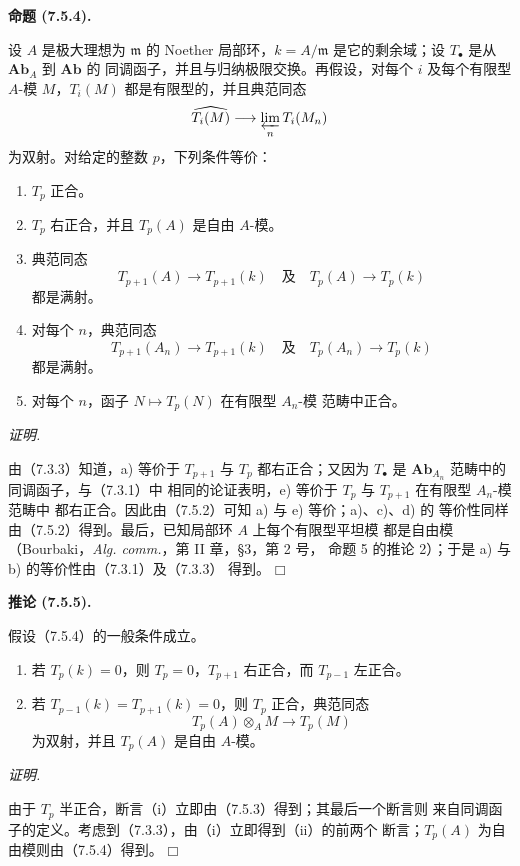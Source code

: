 \documentclass[UTF8,fontset=none,11pt,oneside,openany]{ctexbook}
\providecommand{\square}{\mdlgwhtsquare}
\newenvironment{proposition}[1][]{%
  \par\medskip\noindent\textbf{命题 (#1).}\ %
}{\par}
\newenvironment{corollary}[1][]{%
  \par\medskip\noindent\textbf{推论 (#1).}\ %
}{\par}
\newenvironment{proof}{%
  \par\smallskip\noindent\textit{证明.}\ %
}{\hfill$\square$\par}
\begin{document}
\begin{proposition}[7.5.4]
设 $A$ 是极大理想为 $\mathfrak m$ 的 Noether 局部环，$k=A/\mathfrak m$
是它的剩余域；设 $T_\bullet$ 是从 $\mathbf{Ab}_A$ 到 $\mathbf{Ab}$ 的
同调函子，并且与归纳极限交换。再假设，对每个 $i$ 及每个有限型
$A$-模 $M$，$T_i(M)$ 都是有限型的，并且典范同态
\[
  \widehat{T_i(M)}
  \longrightarrow
  \varprojlim_n T_i(M_n)
\]
为双射。对给定的整数 $p$，下列条件等价：
\begin{enumerate}
  \item[a)] $T_p$ 正合。
  \item[b)] $T_p$ 右正合，并且 $T_p(A)$ 是自由 $A$-模。
  \item[c)] 典范同态
    \[
      T_{p+1}(A)\longrightarrow T_{p+1}(k)
      \quad\text{及}\quad
      T_p(A)\longrightarrow T_p(k)
    \]
    都是满射。
  \item[d)] 对每个 $n$，典范同态
    \[
      T_{p+1}(A_n)\longrightarrow T_{p+1}(k)
      \quad\text{及}\quad
      T_p(A_n)\longrightarrow T_p(k)
    \]
    都是满射。
  \item[e)] 对每个 $n$，函子 $N\mapsto T_p(N)$ 在有限型 $A_n$-模
    范畴中正合。
\end{enumerate}
\end{proposition}

\begin{proof}
由（7.3.3）知道，a) 等价于 $T_{p+1}$ 与 $T_p$ 都右正合；又因为
$T_\bullet$ 是 $\mathbf{Ab}_{A_n}$ 范畴中的同调函子，与（7.3.1）中
相同的论证表明，e) 等价于 $T_p$ 与 $T_{p+1}$ 在有限型 $A_n$-模范畴中
都右正合。因此由（7.5.2）可知 a) 与 e) 等价；a)、c)、d) 的
等价性同样由（7.5.2）得到。最后，已知局部环 $A$ 上每个有限型平坦模
都是自由模（Bourbaki，\emph{Alg. comm.}，第 II 章，\S 3，第 2 号，
命题 5 的推论 2）；于是 a) 与 b) 的等价性由（7.3.1）及（7.3.3）
得到。
\end{proof}

\begin{corollary}[7.5.5]
假设（7.5.4）的一般条件成立。
\begin{enumerate}
  \item[(i)] 若 $T_p(k)=0$，则 $T_p=0$，$T_{p+1}$ 右正合，而
    $T_{p-1}$ 左正合。
  \item[(ii)] 若 $T_{p-1}(k)=T_{p+1}(k)=0$，则 $T_p$ 正合，典范同态
    \[
      T_p(A)\otimes_A M\longrightarrow T_p(M)
    \]
    为双射，并且 $T_p(A)$ 是自由 $A$-模。
\end{enumerate}
\end{corollary}

\begin{proof}
由于 $T_p$ 半正合，断言（i）立即由（7.5.3）得到；其最后一个断言则
来自同调函子的定义。考虑到（7.3.3），由（i）立即得到（ii）的前两个
断言；$T_p(A)$ 为自由模则由（7.5.4）得到。
\end{proof}
\end{document}

